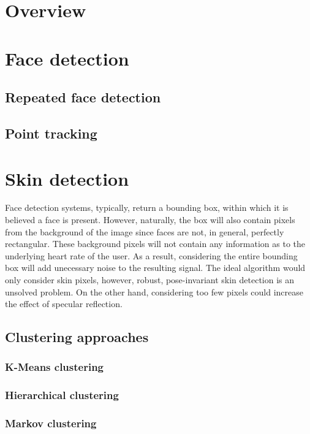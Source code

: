 \section{Overview}
\section{Face detection}
\subsection{Repeated face detection}
\subsection{Point tracking}

\section{Skin detection}
Face detection systems, typically, return a bounding box, within which it is believed
a face is present. However, naturally, the box will also contain pixels from the background of 
the image since faces are not, in general, perfectly rectangular.
These background pixels will not contain any information as to the underlying heart rate of the user.
As a result, considering the entire bounding box will add unecessary noise to the resulting signal.
The ideal algorithm would only consider skin pixels, however, robust, pose-invariant skin detection is an unsolved problem.
On the other hand, considering too few pixels could increase the effect of specular reflection.

\subsection{Clustering approaches}
\subsubsection{K-Means clustering}
\subsubsection{Hierarchical clustering}
\subsubsection{Markov clustering}

\subsection{}
